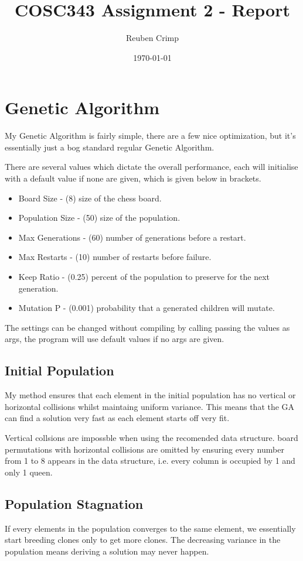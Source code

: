 \documentclass[a4paper,11pt]{article}
\title{COSC343 Assignment 2 - Report}
\author{Reuben Crimp}
\date{\today}
\begin{document}
\maketitle

\section*{Genetic Algorithm}
My Genetic Algorithm is fairly simple, there are a few nice optimization, but it's essentially just a bog standard regular Genetic Algorithm.

There are several values which dictate the overall performance, each will initialise with a default value if none are given, which is given below in brackets.
\begin{itemize}
  \item Board Size - (8) size of the chess board.
  \item Population Size - (50) size of the population.
  \item Max Generations - (60) number of generations before a restart.
  \item Max Restarts - (10) number of restarts before failure.
  \item Keep Ratio - (0.25) percent of the population to preserve for the next generation.
  \item Mutation P - (0.001) probability that a generated children will mutate.
\end{itemize}

The settings can be changed without compiling by calling passing the values as args, the program will use default values if no args are given.

\subsection*{Initial Population}
My method ensures that each element in the initial population has no vertical or horizontal collisions whilst maintaing uniform variance. This means that the GA can find a solution very fast as each element starts off very fit. 

Vertical collsions are impossble when using the recomended data structure. board permutations with horizontal collisions are omitted by ensuring every number from 1 to 8 appears in the data structure, i.e. every column is occupied by 1 and only 1 queen.
\subsection*{Population Stagnation}
If every elements in the population converges to the same element, we essentially start breeding clones only to get more clones. The decreasing variance in the population means deriving a solution may never happen.
\end{document}
